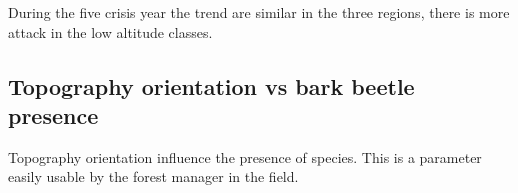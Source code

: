 \documentclass[3p,procedia]{elsarticle}
\begin{document}
During the five crisis year the trend are similar in the three regions, there is more attack in the low altitude classes. 



	


\subsection{Topography orientation vs bark beetle presence}

Topography orientation influence the presence of species. 
This is a parameter easily usable by the forest manager in the field.  
\end{document}
